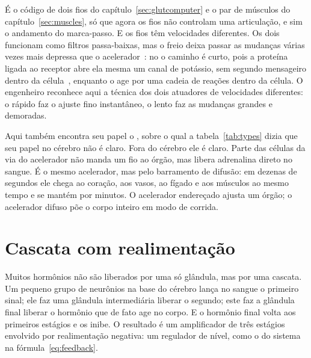 É o código de dois fios do capítulo~\ref{sec:glutcomputer} e o par de músculos do capítulo~\ref{sec:muscles}, só que agora os fios não controlam uma articulação, e sim o andamento do marca-passo. E os fios têm velocidades diferentes. Os dois funcionam como filtros passa-baixas, mas o freio deixa passar as mudanças várias vezes mais depressa que o acelerador~\cite{Berger1989}: no  o caminho é curto, pois a proteína ligada ao receptor abre ela mesma um canal de potássio, sem segundo mensageiro dentro da célula~\cite{Logothetis1987gbg}, enquanto o  age por uma cadeia de reações dentro da célula. O engenheiro reconhece aqui a técnica dos dois atuadores de velocidades diferentes: o rápido faz o ajuste fino instantâneo, o lento faz as mudanças grandes e demoradas.

Aqui também encontra seu papel o , sobre o qual a tabela~\ref{tab:types} dizia que seu papel no cérebro não é claro. Fora do cérebro ele é claro. Parte das células da via do acelerador não manda um fio ao órgão, mas libera adrenalina direto no sangue. É o mesmo acelerador, mas pelo barramento de difusão: em dezenas de segundos ele chega ao coração, aos vasos, ao fígado e aos músculos ao mesmo tempo e se mantém por minutos. O acelerador endereçado  ajusta um órgão; o acelerador difuso  põe o corpo inteiro em modo de corrida.

\section{Cascata com realimentação}

Muitos hormônios não são liberados por uma só glândula, mas por uma cascata. Um pequeno grupo de neurônios na base do cérebro lança no sangue o primeiro sinal; ele faz uma glândula intermediária liberar o segundo; este faz a glândula final liberar o hormônio que de fato age no corpo. E o hormônio final volta aos primeiros estágios e os inibe. O resultado é um amplificador de três estágios envolvido por realimentação negativa: um regulador de nível, como o do sistema  na fórmula~\eqref{eq:feedback}.

